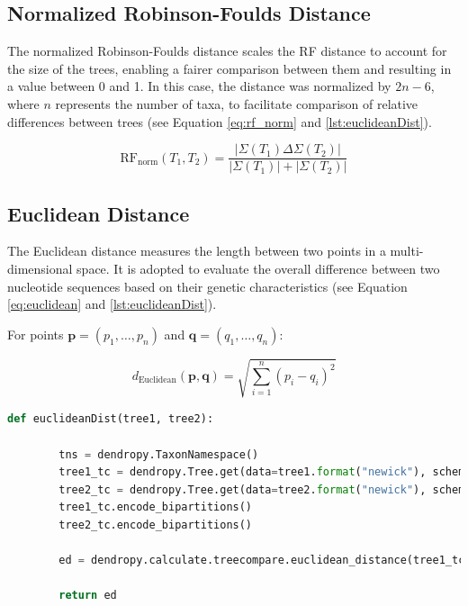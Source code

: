 \subsection{Normalized Robinson-Foulds Distance}\label{RFnorm}
The normalized Robinson-Foulds distance scales the RF distance to account for the size of the trees, enabling a fairer comparison between them and resulting in a value between 0 and 1. In this case, the distance was normalized by $2n-6$, where $n$ represents the number of taxa, to facilitate comparison of relative differences between trees (see Equation \eqref{eq:rf_norm} and \autoref{lst:euclideanDist}).

\begin{equation}\label{eq:rf_norm}
    \text{RF}_{\text{norm}}(T_1, T_2) = \frac{| \Sigma(T_1) \Delta \Sigma(T_2) |}{| \Sigma(T_1) | + | \Sigma(T_2) |}
\end{equation}

\subsection{Euclidean Distance}\label{euclidean}
The Euclidean distance measures the length between two points in a multi-dimensional space. It is adopted to evaluate the overall difference between two nucleotide sequences based on their genetic characteristics (see Equation \eqref{eq:euclidean} and \autoref{lst:euclideanDist}).

For points $\mathbf{p} = (p_1, \ldots, p_n)$ and $\mathbf{q} = (q_1, \ldots, q_n)$:

\begin{equation}\label{eq:euclidean}
    d_{\text{Euclidean}}(\mathbf{p}, \mathbf{q}) = \sqrt{\sum_{i=1}^{n} (p_i - q_i)^2}
\end{equation}

\begin{lstlisting}[label=lst:euclideanDist,language=Python,caption=Python script for calculating the Euclidean distance using the ete3 package in the \textit{aPhyloGeo} package]
    def euclideanDist(tree1, tree2):
        
        tns = dendropy.TaxonNamespace()
        tree1_tc = dendropy.Tree.get(data=tree1.format("newick"), schema="newick", taxon_namespace=tns)
        tree2_tc = dendropy.Tree.get(data=tree2.format("newick"), schema="newick", taxon_namespace=tns)
        tree1_tc.encode_bipartitions()
        tree2_tc.encode_bipartitions()

        ed = dendropy.calculate.treecompare.euclidean_distance(tree1_tc, tree2_tc)

        return ed
\end{lstlisting}

